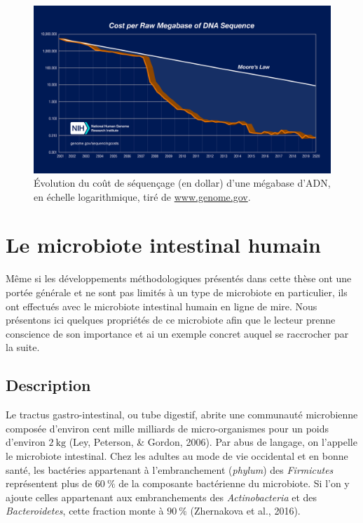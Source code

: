 \documentclass[12pt,a4paper]{reedthesis}
\theoremstyle{definition}
\theoremstyle{definition}
\theoremstyle{definition}
\theoremstyle{remark}
\begin{document}
\begin{figure}[t]

{\centering \includegraphics[width=0.9\linewidth]{img/couts} 

}

\caption{Évolution du coût de séquençage (en dollar) d'une mégabase d'ADN, en échelle logarithmique, tiré de \url{www.genome.gov}.}\label{fig:couts}
\end{figure}
\hypertarget{microbiote}{%
\section{Le microbiote intestinal humain}\label{microbiote}}

Même si les développements méthodologiques présentés dans cette thèse ont une portée générale et ne sont pas limités à un type de microbiote en particulier, ils ont effectués avec le microbiote intestinal humain en ligne de mire. Nous présentons ici quelques propriétés de ce microbiote afin que le lecteur prenne conscience de son importance et ai un exemple concret auquel se raccrocher par la suite.

\hypertarget{description}{%
\subsection{Description}\label{description}}

Le tractus gastro-intestinal, ou tube digestif, abrite une communauté microbienne composée d'environ cent mille milliards de micro-organismes pour un poids d'environ \(2~\text{kg}\) (Ley, Peterson, \& Gordon, 2006). Par abus de langage, on l'appelle le microbiote intestinal. Chez les adultes au mode de vie occidental et en bonne santé, les bactéries appartenant à l'embranchement (\emph{phylum}) des \emph{Firmicutes} représentent plus de \(60~\%\) de la composante bactérienne du microbiote. Si l'on y ajoute celles appartenant aux embranchements des \emph{Actinobacteria} et des \emph{Bacteroidetes}, cette fraction monte à \(90~\%\) (Zhernakova et al., 2016).
\end{document}

